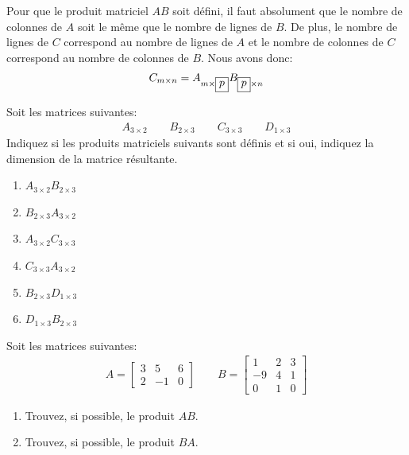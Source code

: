 \documentclass[]{book}
\providecommand{\tightlist}{%
  \setlength{\itemsep}{0pt}\setlength{\parskip}{0pt}}
\theoremstyle{definition}
\theoremstyle{definition}
\theoremstyle{definition}
\theoremstyle{remark}
\let\BeginKnitrBlock\begin \let\EndKnitrBlock\end
\begin{document}
\BeginKnitrBlock{remark}
{}Pour que le produit matriciel \(AB\) soit défini, il faut absolument que le nombre de colonnes de \(A\) soit le même que le nombre de lignes de \(B\). De plus, le nombre de lignes de \(C\) correspond au nombre de lignes de \(A\) et le nombre de colonnes de \(C\) correspond au nombre de colonnes de \(B\). Nous avons donc:
\begin{align*}
C_{m\times n} = A_{m\times \fbox{$p$}}B_{\fbox{$p$} \times n}
\end{align*}
\EndKnitrBlock{remark}

\BeginKnitrBlock{example}
\protect\hypertarget{exm:unnamed-chunk-63}{}{\label{exm:unnamed-chunk-63} }Soit les matrices suivantes:
\begin{align*}
A_{3\times 2} \qquad B_{2\times 3} \qquad C_{3\times 3} \qquad D_{1\times 3}
\end{align*}
Indiquez si les produits matriciels suivants sont définis et si oui, indiquez la dimension de la matrice résultante.

\begin{enumerate}
\def\labelenumi{\alph{enumi}.}
\tightlist
\item
  \(A_{3\times 2}B_{2\times 3}\)
\item
  \(B_{2\times 3}A_{3\times 2}\)
\item
  \(A_{3\times 2}C_{3\times 3}\)
\item
  \(C_{3\times 3}A_{3\times 2}\)
\item
  \(B_{2\times 3}D_{1\times 3}\)
\item
  \(D_{1\times 3}B_{2\times 3}\)
\end{enumerate}
\EndKnitrBlock{example}

\BeginKnitrBlock{example}
\protect\hypertarget{exm:unnamed-chunk-64}{}{\label{exm:unnamed-chunk-64} }Soit les matrices suivantes:
\begin{align*}
A=\begin{bmatrix}
3 & 5 & 6 \\
2 & -1 & 0
\end{bmatrix}
\qquad 
B=\begin{bmatrix}
1 & 2 & 3 \\
-9 & 4 & 1 \\
0 & 1 & 0
\end{bmatrix}
\end{align*}

\begin{enumerate}
\def\labelenumi{\alph{enumi}.}
\tightlist
\item
  Trouvez, si possible, le produit \(AB\).
\item
  Trouvez, si possible, le produit \(BA\).
\end{enumerate}
\EndKnitrBlock{example}
\end{document}
